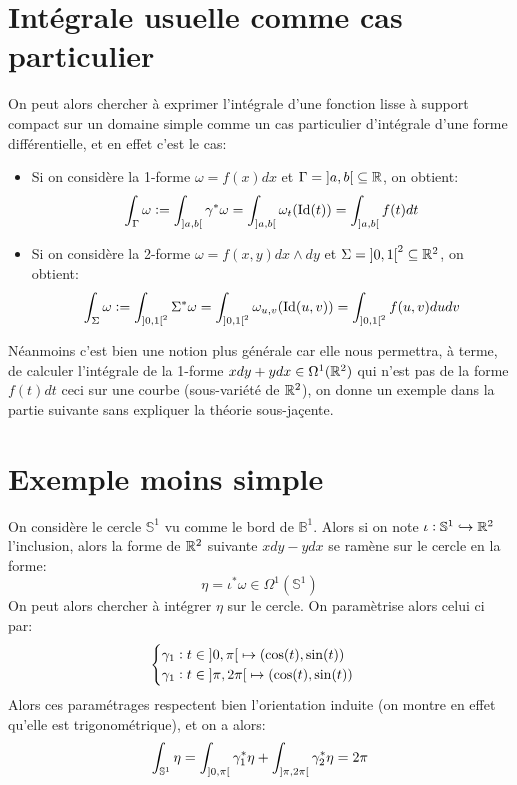 \section{Intégrale usuelle comme cas particulier}
On peut alors chercher à exprimer l'intégrale d'une fonction lisse à support compact sur un domaine simple comme un cas particulier d'intégrale d'une forme différentielle, et en effet c'est le cas:
\begin{itemize}
   \item Si on considère la 1-forme \( \omega = f(x)dx \) et \( \Gamma = \ioo{a}{b} \subseteq \R\), on obtient:
   \[ 
      \int_\Gamma \omega := \int_{\ioo{a}{b}}  \gamma^*\omega = \int_{\ioo{a}{b}}  \omega_{t}(\text{Id}(t)) = \int_{\ioo{a}{b}} f(t)dt
   \]
   \item Si on considère la 2-forme \( \omega = f(x, y)dx \wedge dy \) et \( \Sigma = \ioo{0}{1}^2 \subseteq \R^2 \), on obtient:
   \[ 
      \int_\Sigma \omega := \int_{\ioo{0}{1}^2}  \Sigma^*\omega = \int_{\ioo{0}{1}^2}   \omega_{u, v}(\text{Id}(u, v)) = \int_{\ioo{0}{1}^2}  f(u, v)dudv
   \]
\end{itemize}
Néanmoins c'est bien une notion plus générale car elle nous permettra, à terme, de calculer l'intégrale de la 1-forme \( xdy + ydx \in \Omega^1(\mathbb{R}^2) \) qui n'est pas de la forme \( f(t)dt \) ceci sur une courbe (sous-variété de \( \mathbb{R}^2 \)), on donne un exemple dans la partie suivante sans expliquer la théorie sous-jaçente.
\pagebreak 
\section{Exemple moins simple}
On considère le cercle \( \mathbb{S}^1 \) vu comme le bord de \( \mathbb{B}^1 \). Alors si on note \( \iota : \mathbb{S}^1 \hookrightarrow \mathbb{R}^2 \) l'inclusion, alors la forme de \( \mathbb{R}^2 \) suivante \(xdy - ydx\) se ramène sur le cercle en la forme:
\[ 
   \eta = \iota^*\omega \in \Omega^1(\mathbb{S}^1) 
\]
On peut alors chercher à intégrer \( \eta \) sur le cercle. On paramètrise alors celui ci par:
\[ 
   \begin{cases}
      \gamma_1 : t \in \ioo{0}{\pi} \mapsto (\cos(t), \sin(t))\\
      \gamma_1 : t \in \ioo{\pi}{2\pi} \mapsto (\cos(t), \sin(t))\\
   \end{cases} 
\]
Alors ces paramétrages respectent bien l'orientation induite (on montre en effet qu'elle est trigonométrique), et on a alors:
\[ 
   \int_{\mathbb{S}^1} \eta = \int_{\ioo{0}{\pi}} \gamma_1^*\eta + \int_{\ioo{ \pi}{2\pi}} \gamma_2^*\eta = 2 \pi
\]


